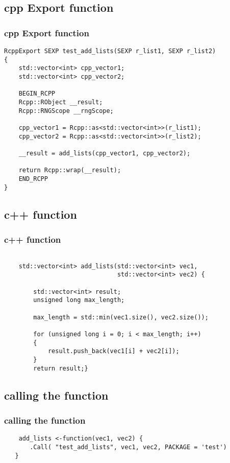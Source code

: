\documentclass[hyperef={
    colorlinks=true,
    linkcolor=blue,
    filecolor=black,
urlcolor=blue}
]{beamer}
\begin{document}
\subsection{cpp Export function}
\begin{frame}[fragile]
\frametitle{cpp Export function}
\begin{verbatim}
RcppExport SEXP test_add_lists(SEXP r_list1, SEXP r_list2)
{        
    std::vector<int> cpp_vector1;
    std::vector<int> cpp_vector2;
        
    BEGIN_RCPP 
    Rcpp::RObject __result;
    Rcpp::RNGScope __rngScope;

    cpp_vector1 = Rcpp::as<std::vector<int>>(r_list1);
    cpp_vector2 = Rcpp::as<std::vector<int>>(r_list2);
    
    __result = add_lists(cpp_vector1, cpp_vector2);
    
    return Rcpp::wrap(__result);
    END_RCPP
}
\end{verbatim}
\end{frame}

\subsection{c++ function}
\begin{frame}[fragile]
\frametitle{c++ function}
\begin{verbatim}

    std::vector<int> add_lists(std::vector<int> vec1,
                               std::vector<int> vec2) {
        
        std::vector<int> result;
        unsigned long max_length;
        
        max_length = std::min(vec1.size(), vec2.size());
        
        for (unsigned long i = 0; i < max_length; i++)
        {
            result.push_back(vec1[i] + vec2[i]);
        }
        return result;}

\end{verbatim} 
\end{frame}

\subsection{calling the function}
\begin{frame}[fragile]
\frametitle{calling the function}

\begin{verbatim}
    add_lists <-function(vec1, vec2) {
       .Call( "test_add_lists", vec1, vec2, PACKAGE = 'test')
   }
\end{verbatim}

\end{frame}
\end{document}
